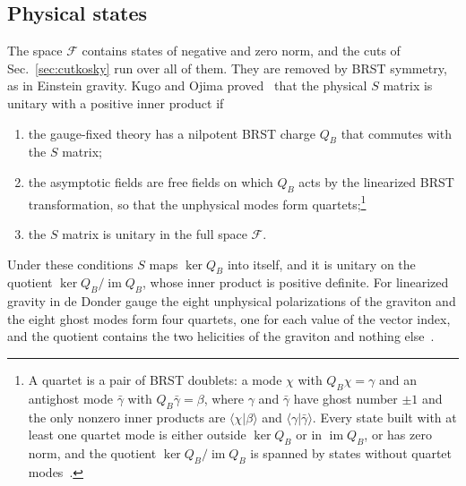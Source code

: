 \documentclass[aps,prd,10pt,twocolumn,superscriptaddress,nofootinbib,floatfix,longbibliography]{revtex4-2}
\begin{document}
\subsection{Physical states}
\label{sec:quartets}

The space $\mathcal F$ contains states of negative and zero norm, and the cuts of Sec.~\ref{sec:cutkosky} run over all of them. They are removed by BRST symmetry, as in Einstein gravity. Kugo and Ojima proved~\cite{KugoOjima1978,KugoOjima1979} that the physical $S$ matrix is unitary with a positive inner product if
\begin{enumerate}[label=\textup{(Q\arabic*)},leftmargin=2.4em,itemsep=0.15em]
\item the gauge-fixed theory has a nilpotent BRST charge $Q_B$ that commutes with the $S$ matrix;
\item the asymptotic fields are free fields on which $Q_B$ acts by the linearized BRST transformation, so that the unphysical modes form quartets;\footnote{A quartet is a pair of BRST doublets: a mode $\chi$ with $Q_B\chi=\gamma$ and an antighost mode $\bar\gamma$ with $Q_B\bar\gamma=\beta$, where $\gamma$ and $\bar\gamma$ have ghost number $\pm1$ and the only nonzero inner products are $\langle\chi|\beta\rangle$ and $\langle\gamma|\bar\gamma\rangle$. Every state built with at least one quartet mode is either outside $\ker Q_B$ or in $\operatorname{im}Q_B$, or has zero norm, and the quotient $\ker Q_B/\operatorname{im}Q_B$ is spanned by states without quartet modes~\cite{KugoOjima1979}.}
\item the $S$ matrix is unitary in the full space $\mathcal F$.
\end{enumerate}
Under these conditions $S$ maps $\ker Q_B$ into itself, and it is unitary on the quotient $\ker Q_B/\operatorname{im}Q_B$, whose inner product is positive definite. For linearized gravity in de Donder gauge the eight unphysical polarizations of the graviton and the eight ghost modes form four quartets, one for each value of the vector index, and the quotient contains the two helicities of the graviton and nothing else~\cite{KugoOjima1978}.
\end{document}
